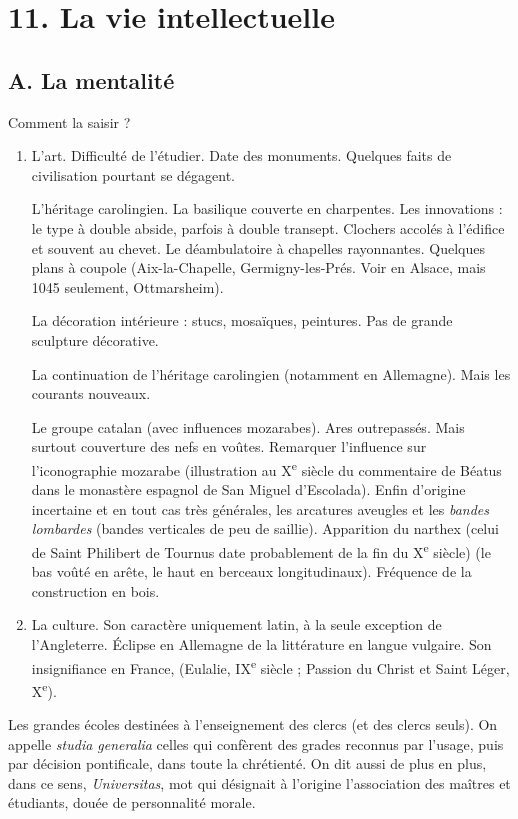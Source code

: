 \documentclass[french,twoside]{book} %
\newcommand\chapteropen{} %
\newcommand\chaptercont{} %
\renewcommand\chapteropen{} %
\renewcommand\chaptercont{} %
\begin{document}
\chapteropen
\chapter[11. La vie intellectuelle]{\textsc{11. }La vie intellectuelle}
\label{c11}

\chaptercont
\section[A. La mentalité]{A. La mentalité}
\label{c11a}
\noindent  {}
\label{p115} Comment la saisir ?\par

\begin{enumerate}[itemsep=\baselineskip,]
\item L’art. Difficulté de l’étudier. Date des monuments. Quelques faits de civilisation pourtant se dégagent.\par
L’héritage carolingien. La basilique couverte en charpentes. Les innovations : le type à double abside, parfois à double transept. Clochers accolés à l’édifice et souvent au chevet. Le déambulatoire à chapelles rayonnantes. Quelques plans à coupole (Aix-la-Chapelle, Germigny-les-Prés. Voir en Alsace, mais 1045 seulement, Ottmarsheim).\par
La décoration intérieure : stucs, mosaïques, peintures. Pas de grande sculpture décorative.\par
La continuation de l’héritage carolingien (notamment en Allemagne). Mais les courants nouveaux.\par
Le groupe catalan (avec influences mozarabes). Ares outrepassés. Mais surtout couverture des nefs en voûtes. Remarquer l’influence sur l’iconographie mozarabe (illustration au X\textsuperscript{e} siècle du commentaire de Béatus dans le monastère espagnol de San Miguel d’Escolada). Enfin d’origine incertaine et en tout cas très générales, les arcatures aveugles et les \emph{bandes lombardes} (bandes verticales de peu de saillie). Apparition du narthex (celui de Saint Philibert de Tournus date probablement de la fin du X\textsuperscript{e} siècle) (le bas voûté en arête, le haut en berceaux longitudinaux). Fréquence de la construction en bois.

\item La culture. Son caractère uniquement latin, à la seule exception de l’Angleterre. Éclipse en Allemagne de la littérature en langue vulgaire. Son insignifiance en France, (Eulalie, IX\textsuperscript{e} siècle ; Passion du Christ et Saint Léger, X\textsuperscript{e}).

\end{enumerate}\noindent Les grandes écoles destinées à l’enseignement des clercs (et des clercs seuls). On appelle \emph{studia generalia} celles qui confèrent des grades reconnus par l’usage, puis par décision pontificale, dans toute la chrétienté. On dit aussi de plus en plus, dans ce sens, {\itshape Universitas}, mot qui désignait à l’origine l’association des maîtres et étudiants, douée de personnalité morale.
\end{document}
